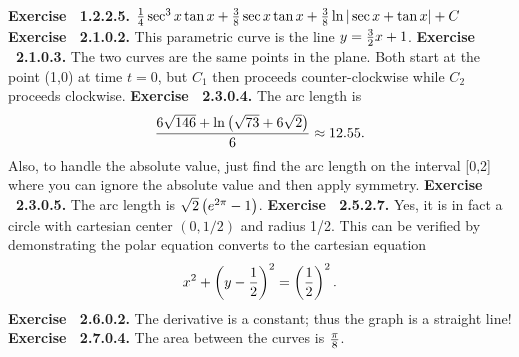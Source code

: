  {\noindent \protect \bf  Exercise ~1.2.2.5.} $\protect \frac  {1}{4}\protect \qopname  \relax o{sec}^3{x}\protect \qopname  \relax o{tan}{x} +\protect \frac  {3}{8} \protect \qopname  \relax o{sec}{x}\protect \qopname  \relax o{tan}{x}+\protect \frac  {3}{8} \protect \qopname  \relax o{ln}{|\protect \qopname  \relax o{sec}{x}+\protect \qopname  \relax o{tan}{x}|}+C$ \protect \newline  \protect \newline  
 {\noindent \protect \bf  Exercise ~2.1.0.2.} This parametric curve is the line $y=\protect \frac  {3}{2}x+1$. \protect \newline  \protect \newline  
 {\noindent \protect \bf  Exercise ~2.1.0.3.} The two curves are the same points in the plane. Both start at the point (1,0) at time $t=0$, but $C_1$ then proceeds counter-clockwise while $C_2$ proceeds clockwise. \protect \newline  \protect \newline  
 {\noindent \protect \bf  Exercise ~2.3.0.4.} The arc length is $$\protect \frac  {6\protect \sqrt  {146}+\protect \qopname  \relax o{ln}\left (\protect \sqrt  {73}+6\protect \sqrt  {2}\right )}{6}\approx 12.55.$$ Also, to handle the absolute value, just find the arc length on the interval [0,2] where you can ignore the absolute value and then apply symmetry. \protect \newline  \protect \newline  
 {\noindent \protect \bf  Exercise ~2.3.0.5.} The arc length is $\protect \sqrt  {2}\left (e^{2\pi }-1\right )$. \protect \newline  \protect \newline  
 {\noindent \protect \bf  Exercise ~2.5.2.7.} Yes, it is in fact a circle with cartesian center $\left (0,1/2\right )$ and radius 1/2. This can be verified by demonstrating the polar equation converts to the cartesian equation $$x^2+\left (y-\protect \frac  {1}{2}\right )^2=\left (\protect \frac  {1}{2}\right )^2. $$ \protect \newline  \protect \newline  
 {\noindent \protect \bf  Exercise ~2.6.0.2.} The derivative is a constant; thus the graph is a straight line! \protect \newline  \protect \newline  
 {\noindent \protect \bf  Exercise ~2.7.0.4.} The area between the curves is $\protect \frac  {\pi }{8}$. \protect \newline  \protect \newline  
